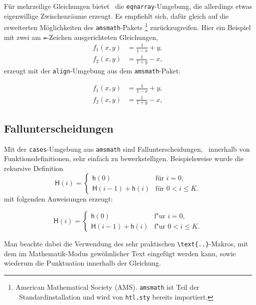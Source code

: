 Für mehrzeilige Gleichungen bietet \latex\ die 
\verb!eqnarray!-Umgebung, die allerdings etwas eigenwillige Zwischenräume erzeugt.
Es empfiehlt sich, dafür gleich auf die erweiterten Möglichkeiten des \texttt{amsmath}-Pakets%
\footnote{American Mathematical Society (AMS). \texttt{amsmath} ist Teil der \latex\ Standardinstallation und wird von \texttt{htl.sty} bereits importiert.}
\cite{amsldoc02} zurückzugreifen.
Hier ein Beispiel mit zwei am \texttt{=}-Zeichen ausgerichteten Gleichungen,
%
\begin{align}
f_1 (x,y) &= \frac{1}{1-x} + y , \label{eq:f1} \\
f_2 (x,y) &= \frac{1}{1+y} - x , \label{eq:f2}
\end{align}
%
erzeugt mit der \texttt{align}-Umgebung aus dem \texttt{amsmath}-Paket:
%
\begin{LaTeXCode}
\begin{align}
  f_1 (x,y) &= \frac{1}{1-x} + y , \label{eq:f1} \\
  f_2 (x,y) &= \frac{1}{1+y} - x , \label{eq:f2}
\end{align}
\end{LaTeXCode}


\subsection{Fallunterscheidungen}

Mit der \texttt{cases}-Umgebung aus \texttt{amsmath} sind Fallunterscheidungen, \ua\ innerhalb von Funktionsdefinitionen, sehr einfach zu bewerkstelligen. Beispielsweise wurde die rekursive Definition
%
\begin{equation}
\mathsf{H}(i) =
\begin{cases}
  \mathsf{h}(0)                 & \text{für $i = 0$},\\
  \mathsf{H}(i-1) + \mathsf{h}(i) & \text{für $0 < i \leq K$}.
\end{cases}
\end{equation}
mit folgenden Anweisungen erzeugt:
%
\begin{LaTeXCode}
\begin{equation}
\mathsf{H}(i) =
\begin{cases}
  \mathsf{h}(0) & \text{f"ur $i = 0$},\\
  \mathsf{H}(i-1) + \mathsf{h}(i) & \text{f"ur $0 < i \leq K$}.
\end{cases}
\end{equation}
\end{LaTeXCode}
%
Man beachte dabei die Verwendung des sehr praktischen \verb!\text{..}!-Makros, mit dem im Mathematik-Modus gewöhnlicher Text eingefügt werden kann, sowie wiederum die Punktuation innerhalb der Gleichung.

